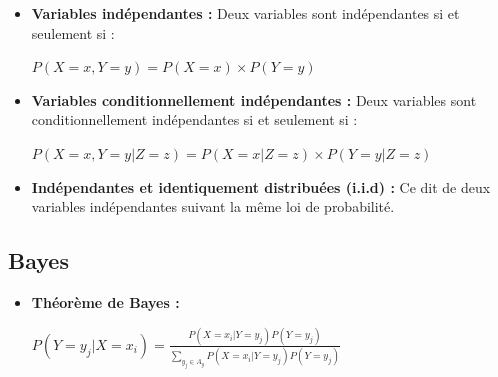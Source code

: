 \documentclass{article}
\begin{document}
\begin{itemize}

\item \textbf{Variables indépendantes :} Deux variables sont indépendantes si et seulement si :

$ P(X = x, Y = y) = P(X = x) \times P(Y = y) $

\item \textbf{Variables conditionnellement indépendantes :} Deux variables sont conditionnellement indépendantes si et seulement si :

$ P(X = x, Y = y | Z = z) = P(X = x | Z = z) \times P(Y = y | Z = z) $

\item \textbf{Indépendantes et identiquement distribuées (i.i.d) :} Ce dit de deux variables indépendantes suivant la même loi de probabilité.

\end{itemize}

\subsection{Bayes}

\begin{itemize}

\item \textbf{Théorème de Bayes :}

$ P(Y = y_j | X = x_i) = \frac{P(X = x_i | Y = y_j) P(Y = y_j)}{\sum_{y_j \in A_y} P(X = x_i | Y = y_j) P(Y = y_j)}  $

\end{itemize}
\end{document}
